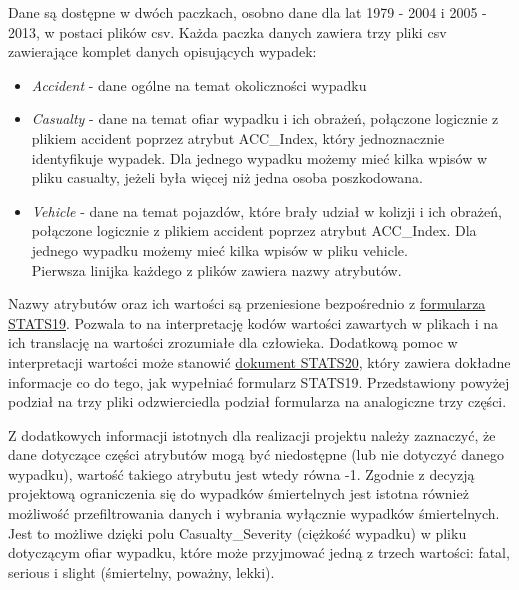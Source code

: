 Dane są dostępne w dwóch paczkach, osobno dane dla lat 1979 - 2004 i
2005 - 2013, w postaci plików csv. Każda paczka danych zawiera trzy
pliki csv zawierające komplet danych opisujących wypadek:

\begin{itemize}
\itemsep1pt\parskip0pt
\item
  \emph{Accident} - dane ogólne na temat okoliczności wypadku\\
\item
  \emph{Casualty} - dane na temat ofiar wypadku i ich obrażeń, połączone
  logicznie z plikiem accident poprzez atrybut ACC\_Index, który
  jednoznacznie identyfikuje wypadek. Dla jednego wypadku możemy mieć
  kilka wpisów w pliku casualty, jeżeli była więcej niż jedna osoba
  poszkodowana.\\
\item
  \emph{Vehicle} - dane na temat pojazdów, które brały udział w kolizji
  i ich obrażeń, połączone logicznie z plikiem accident poprzez atrybut
  ACC\_Index. Dla jednego wypadku możemy mieć kilka wpisów w pliku
  vehicle.\\Pierwsza linijka każdego z plików zawiera nazwy atrybutów.
\end{itemize}

Nazwy atrybutów oraz ich wartości są przeniesione bezpośrednio z
\href{https://www.gov.uk/government/uploads/system/uploads/attachment_data/file/230590/stats19.pdf}{formularza
STATS19}. Pozwala to na interpretację kodów wartości zawartych w plikach
i na ich translację na wartości zrozumiałe dla człowieka. Dodatkową
pomoc w interpretacji wartości może stanowić
\href{https://www.gov.uk/government/uploads/system/uploads/attachment_data/file/230596/stats20-2011.pdf}{dokument
STATS20}, który zawiera dokładne informacje co do tego, jak wypełniać
formularz STATS19. Przedstawiony powyżej podział na trzy pliki
odzwierciedla podział formularza na analogiczne trzy części.

Z dodatkowych informacji istotnych dla realizacji projektu należy
zaznaczyć, że dane dotyczące części atrybutów mogą być niedostępne (lub
nie dotyczyć danego wypadku), wartość takiego atrybutu jest wtedy równa
-1. Zgodnie z decyzją projektową ograniczenia się do wypadków
śmiertelnych jest istotna również możliwość przefiltrowania danych i
wybrania wyłącznie wypadków śmiertelnych. Jest to możliwe dzięki polu
Casualty\_Severity (ciężkość wypadku) w pliku dotyczącym ofiar wypadku,
które może przyjmować jedną z trzech wartości: fatal, serious i slight
(śmiertelny, poważny, lekki).

